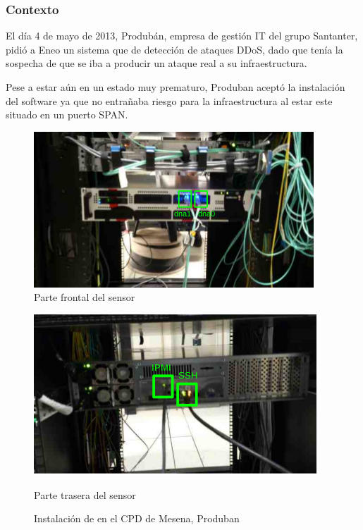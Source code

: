 \subsubsection{Contexto}
El día 4 de mayo de 2013, Produbán, empresa de gestión IT del grupo Santanter, pidió a Eneo un sistema que de detección 
de ataques \gls{DDoS}, dado que tenía la sospecha de que se iba a producir un ataque real a su infraestructura.

Pese a estar aún en un estado muy prematuro, Produban aceptó la instalación del software ya que no entrañaba riesgo 
para la infraestructura al estar este situado en un puerto SPAN.

\begin{figure}[hbtp]
  \centering
  \includegraphics[width=\columnwidth]{CapituloPruebas/Figuras/ProdubanFrontal}
  \caption{Parte frontal del sensor}
  \label{fig:produban_mesena_frontal}
\end{figure}
\begin{figure}[hbtp]
  \includegraphics[width=\columnwidth]{CapituloPruebas/Figuras/ProdubanTrasera}
  \caption{Parte trasera del sensor}
  \label{fig:produban_mesena_trasera}
\caption{Instalación de \redborderddos{} en el CPD de Mesena, Produban}
\end{figure}
%


